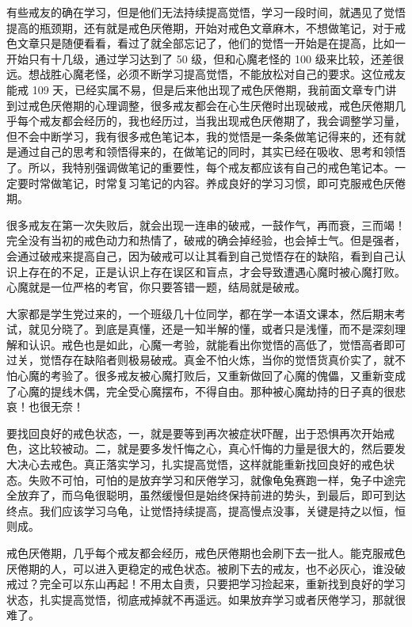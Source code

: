 \begin{case}
    有些戒友的确在学习，但是他们无法持续提高觉悟，学习一段时间，就遇见了觉悟提高的瓶颈期，还有就是戒色厌倦期，开始对戒色文章麻木，不想做笔记，对于戒色文章只是随便看看，看过了就全部忘记了，他们的觉悟一开始是在提高，比如一开始只有十几级，通过学习达到了 50 级，但和心魔老怪的 100 级来比较，还差很远。想战胜心魔老怪，必须不断学习提高觉悟，不能放松对自己的要求。这位戒友能戒 109 天，已经实属不易，但是后来他出现了戒色厌倦期，我前面文章专门讲到过戒色厌倦期的心理调整，很多戒友都会在心生厌倦时出现破戒，戒色厌倦期几乎每个戒友都会经历的，我也经历过，当我出现戒色厌倦期了，我会调整学习量，但不会中断学习，我有很多戒色笔记本，我的觉悟是一条条做笔记得来的，还有就是通过自己的思考和领悟得来的，在做笔记的同时，其实已经在吸收、思考和领悟了。所以，我特别强调做笔记的重要性，每个戒友都应该有自己的戒色笔记本。一定要时常做笔记，时常复习笔记的内容。养成良好的学习习惯，即可克服戒色厌倦期。

    很多戒友在第一次失败后，就会出现一连串的破戒，一鼓作气，再而衰，三而竭！完全没有当初的戒色动力和热情了，破戒的确会掉经验，也会掉士气。但是强者，会通过破戒来提高自己，因为破戒可以让其看到自己觉悟存在的缺陷，看到自己认识上存在的不足，正是认识上存在误区和盲点，才会导致遭遇心魔时被心魔打败。心魔就是一位严格的考官，你只要答错一题，结局就是破戒。

    大家都是学生党过来的，一个班级几十位同学，都在学一本语文课本，然后期末考试，就见分晓了。到底是真懂，还是一知半解的懂，或者只是浅懂，而不是深刻理解和认识。戒色也是如此，心魔一考验，就能看出你觉悟的高低了，觉悟高者即可过关，觉悟存在缺陷者则极易破戒。真金不怕火炼，当你的觉悟货真价实了，就不怕心魔的考验了。很多戒友被心魔打败后，又重新做回了心魔的傀儡，又重新变成了心魔的提线木偶，完全受心魔摆布，不得自由。那种被心魔劫持的日子真的很悲哀！也很无奈！

    要找回良好的戒色状态，一，就是要等到再次被症状吓醒，出于恐惧再次开始戒色，这比较被动。二，就是要多发忏悔之心，真心忏悔的力量是很大的，然后要发大决心去戒色。真正落实学习，扎实提高觉悟，这样就能重新找回良好的戒色状态。失败不可怕，可怕的是放弃学习和厌倦学习，就像龟兔赛跑一样，兔子中途完全放弃了，而乌龟很聪明，虽然缓慢但是始终保持前进的势头，到最后，即可到达终点。我们应该学习乌龟，让觉悟持续提高，提高慢点没事，关键是持之以恒，恒则成。

    戒色厌倦期，几乎每个戒友都会经历，戒色厌倦期也会刷下去一批人。能克服戒色厌倦期的人，可以进入更稳定的戒色状态。被刷下去的戒友，也不必灰心，谁没破戒过？完全可以东山再起！不用太自责，只要把学习捡起来，重新找到良好的学习状态，扎实提高觉悟，彻底戒掉就不再遥远。如果放弃学习或者厌倦学习，那就很难了。


\end{case}
